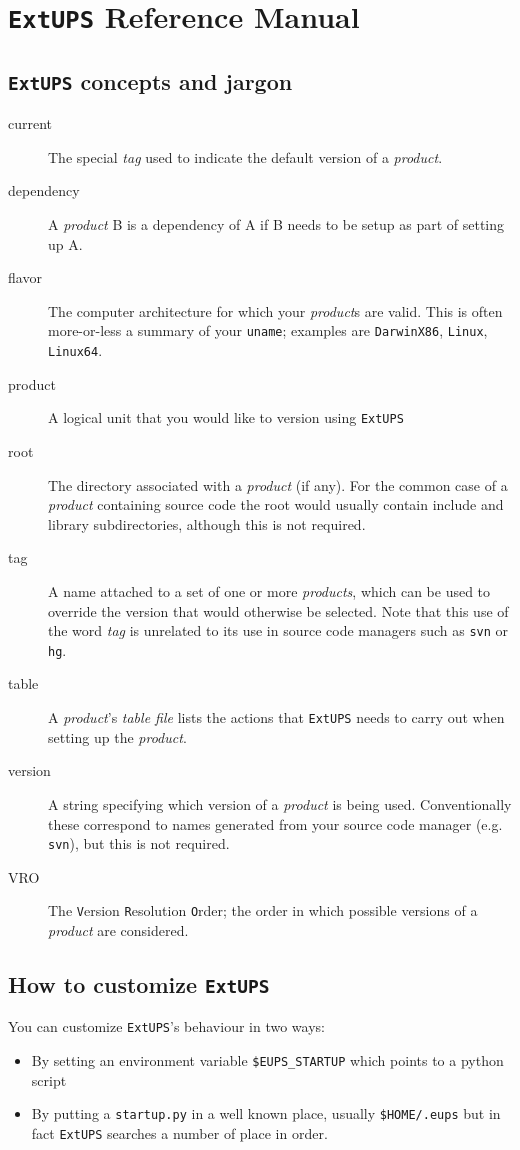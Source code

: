 \documentclass{article}
\newcommand{\code}[1]{\texttt{#1}}
\newcommand{\file}[1]{\texttt{#1}}
\newcommand{\eups}{\code{ExtUPS}\xspace}
\begin{document}
\section{\eups Reference Manual}

\subsection{\eups concepts and jargon}

\begin{description}
\item[current]
  The special \textit{tag} used to indicate the default version of a \textit{product}.
\item[dependency]
  A \textit{product} B is a dependency of A if B needs to be setup as part of setting up A.
\item[flavor]
  The computer architecture for which your \textit{product}s are valid.  This is often more-or-less
  a summary of your \code{uname}; examples are \code{DarwinX86}, \code{Linux}, \code{Linux64}.
\item[product]
  A logical unit that you would like to version using \eups
\item[root]
  The directory associated with a \textit{product} (if any).  For the common case of
  a \textit{product} containing source code the root would usually contain include and library subdirectories,
  although this is not required.
\item[tag]
  A name attached to a set of one or more \textit{products}, which can be used to override the version
  that would otherwise be selected.  Note that this use of the word \textit{tag} is unrelated to its use
  in source code managers such as \code{svn} or \code{hg}.
\item[table]
  A \textit{product}'s \textit{table file} lists the actions that \eups
  needs to carry out when setting up the \textit{product}.
\item[version]
  A string specifying which version of a \textit{product} is being used.  Conventionally these correspond to names
  generated from your source code manager (e.g. \code{svn}), but this is not required.
\item[VRO]
  The \code{V}ersion \code{R}esolution \code{O}rder;  the order in which possible versions of
  a \textit{product} are considered.
\end{description}

\subsection{How to customize \eups}
\label{customization}
You can customize \eups's behaviour in two ways:
\begin{itemize}
\item By setting an environment variable \code{\$EUPS\_STARTUP} which points to a python script
\item By putting a \file{startup.py} in a well known place, usually \file{\$HOME/.eups} but in fact \eups
  searches a number of place in order.
\end{itemize}
\end{document}
